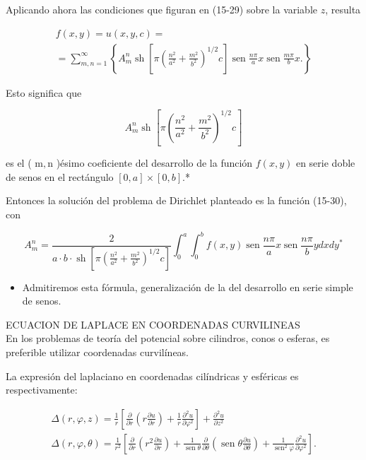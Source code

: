 \documentclass[10pt]{article}
\theoremstyle{plain}
\theoremstyle{definition}
\theoremstyle{remark}
\begin{document}
Aplicando ahora las condiciones que figuran en (15-29) sobre la variable $z$, resulta


\begin{gather*}
f(x, y)=u(x, y, c)= \\
=\sum_{m, n=1}^{\infty}\left\{A_{m}^{n} \operatorname{sh}\left[\pi\left(\frac{n^{2}}{a^{2}}+\frac{m^{2}}{b^{2}}\right)^{1 / 2} c\right] \operatorname{sen} \frac{n \pi}{a} x \operatorname{sen} \frac{m \pi}{b} x .\right\} \tag{15-31}
\end{gather*}


Esto significa que

$$
A_{m}^{n} \operatorname{sh}\left[\pi\left(\frac{n^{2}}{a^{2}}+\frac{m^{2}}{b^{2}}\right)^{1 / 2} c\right]
$$

es el ( $\mathrm{m}, \mathrm{n}$ )ésimo coeficiente del desarrollo de la función $f(x, y)$ en serie doble de senos en el rectángulo $[0, a] \times[0, b]$.*

Entonces la solución del problema de Dirichlet planteado es la función (15-30), con

$$
A_{m}^{n}=\frac{2}{a \cdot b \cdot \operatorname{sh}\left[\pi\left(\frac{n^{2}}{a^{2}}+\frac{m^{2}}{b^{2}}\right)^{1 / 2} c\right]} \int_{0}^{a} \int_{0}^{b} f(x, y) \operatorname{sen} \frac{n \pi}{a} x \operatorname{sen} \frac{n \pi}{b} y d x d y^{*}
$$

\begin{itemize}
  \item Admitiremos esta fórmula, generalización de la del desarrollo en serie simple de senos.
\end{itemize}

ECUACION DE LAPLACE EN COORDENADAS CURVILINEAS\\
En los problemas de teoría del potencial sobre cilindros, conos o esferas, es preferible utilizar coordenadas curvilíneas.

La expresión del laplaciano en coordenadas cilíndricas y esféricas es respectivamente:


\begin{gather*}
\Delta(r, \varphi, z)=\frac{1}{r}\left[\frac{\partial}{\partial r}\left(r \frac{\partial u}{\partial r}\right)+\frac{1}{r} \frac{\partial^{2} u}{\partial \varphi^{2}}\right]+\frac{\partial^{2} u}{\partial z^{2}}  \tag{15-32}\\
\Delta(r, \varphi, \theta)=\frac{1}{r^{2}}\left[\frac{\partial}{\partial r}\left(r^{2} \frac{\partial u}{\partial r}\right)+\frac{1}{\operatorname{sen} \theta} \frac{\partial}{\partial \theta}\left(\operatorname{sen} \theta \frac{\partial u}{\partial \theta}\right)+\frac{1}{\operatorname{sen}^{2} \varphi} \frac{\partial^{2} u}{\partial \varphi^{2}}\right] . \tag{15-33}
\end{gather*}
\end{document}
